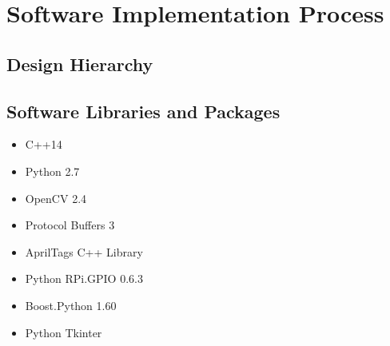
\section{Software Implementation Process}
\label{sec:software_implementation}

\subsection{Design Hierarchy}
\label{sec:software_design}

\subsection{Software Libraries and Packages}
\label{sec:software_libraries}
\begin{itemize}
  \item C++14
  \item Python 2.7 \cite{python27}
  \item OpenCV 2.4 \cite{opencv24}
  \item Protocol Buffers 3 \cite{protobuf3}
  \item AprilTags C++ Library \cite{apriltags}
  \item Python RPi.GPIO 0.6.3 \cite{python_rpigpio}
  \item Boost.Python 1.60 \cite{python_boost}
  \item Python Tkinter \cite{python_tkinter}
\end{itemize}









